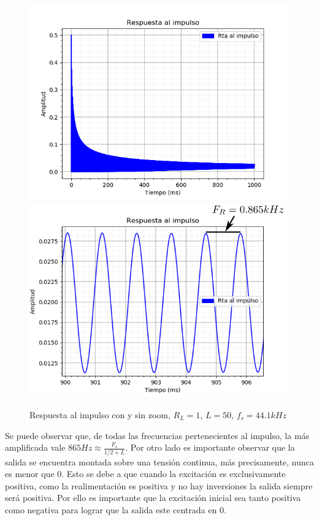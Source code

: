 \documentclass[assd_tp2_main.tex]{subfiles}
\begin{document}
\begin{figure}[H]
	\includegraphics[scale=0.55]{graficos/impulsoBloqueS1.png}
	\includegraphics[scale=0.41]{graficos/impulsoBloqueS1Zoom.png}
	\caption{Respuesta al impulso con y sin zoom, $R_L=1$, $L=50$, $f_s=44.1kHz$}
\end{figure}

Se puede observar que, de todas las frecuencias pertenecientes al impulso, la más amplificada vale $865Hz \approx \frac{F_s}{1/2+L}$. Por otro lado es importante observar que la salida se encuentra montada sobre una tensión continua, más precisamente, nunca es menor que 0. Esto se debe a que cuando la excitación es exclusivamente positiva, como la realimentación es positiva y no hay inversiones la salida siempre será positiva. Por ello es importante que la excitación inicial sea tanto positiva como negativa para lograr que la salida este centrada en 0.
\end{document}
